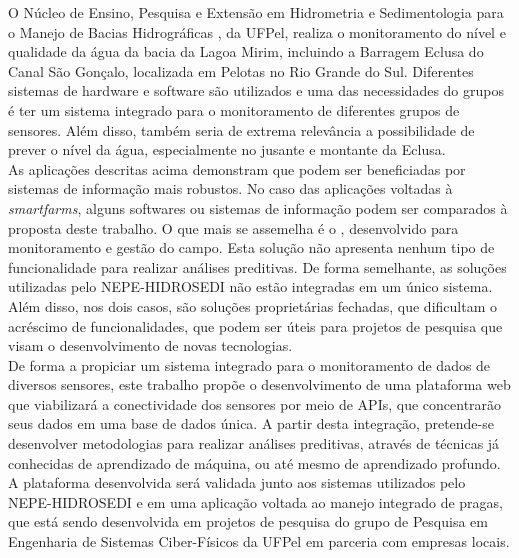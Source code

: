 \documentclass[tcc-proposta]{texufpel}
\begin{document}
O Núcleo de Ensino, Pesquisa e Extensão em Hidrometria e Sedimentologia para o Manejo de Bacias Hidrográficas \citet{hidrosedi:2022}, da UFPel, realiza o monitoramento do nível e qualidade da água da bacia da Lagoa Mirim, incluindo a Barragem Eclusa do Canal São Gonçalo, localizada em Pelotas no Rio Grande do Sul. Diferentes sistemas de hardware e software são utilizados e uma das necessidades do grupos é ter um sistema integrado para o monitoramento de diferentes grupos de sensores. Além disso, também seria de extrema relevância a possibilidade de prever o nível da água, especialmente no jusante e montante da Eclusa.
\\

As aplicações descritas acima demonstram que podem ser beneficiadas por sistemas de informação mais robustos. No caso das aplicações voltadas à \textit{smartfarms}, alguns softwares ou sistemas de informação podem ser comparados à proposta deste trabalho. O que mais se assemelha é o \citet{farmbox:2022}, desenvolvido para monitoramento e gestão do campo. Esta solução não apresenta nenhum tipo de funcionalidade para realizar análises preditivas. De forma semelhante, as soluções utilizadas pelo NEPE-HIDROSEDI não estão integradas em um único sistema. Além disso, nos dois casos, são soluções proprietárias fechadas, que dificultam o acréscimo de funcionalidades, que podem ser úteis para projetos de pesquisa que visam o desenvolvimento de novas tecnologias.
\\

De forma a propiciar um sistema integrado para o monitoramento de dados de diversos sensores, este trabalho propõe o desenvolvimento de uma plataforma web que viabilizará a conectividade dos sensores por meio de APIs, que concentrarão seus dados em uma base de dados única. A partir desta integração, pretende-se desenvolver metodologias para realizar análises preditivas, através de técnicas já conhecidas de aprendizado de máquina, ou até mesmo de aprendizado profundo. A plataforma desenvolvida será validada junto aos sistemas utilizados pelo NEPE-HIDROSEDI e em uma aplicação voltada ao manejo integrado de pragas, que está sendo desenvolvida em projetos de pesquisa do grupo de Pesquisa em Engenharia de Sistemas Ciber-Físicos da UFPel em parceria com empresas locais.  
\end{document}
